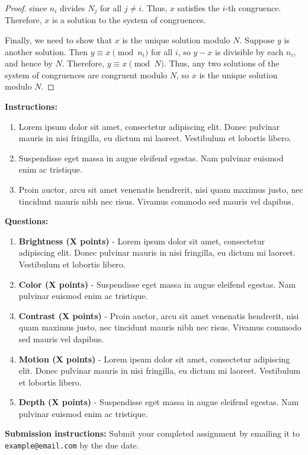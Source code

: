 \documentclass{article}
\begin{document}
\begin{itemize}
\begin{proof}
		since $n_i$ divides $N_j$ for all $j \neq i$. Thus, $x$ satisfies the $i$-th congruence. Therefore, $x$ is a solution to the system of congruences.
		
		Finally, we need to show that $x$ is the unique solution modulo $N$. Suppose $y$ is another solution. Then $y \equiv x \pmod{n_i}$ for all $i$, so $y-x$ is divisible by each $n_i$, and hence by $N$. Therefore, $y \equiv x \pmod{N}$. Thus, any two solutions of the system of congruences are congruent modulo $N$, so $x$ is the unique solution modulo $N$.
	\end{proof}
\end{itemize}

\noindent \textbf{Instructions:}
\begin{enumerate}[label=\alph*.]
    \item Lorem ipsum dolor sit amet, consectetur adipiscing elit. Donec pulvinar mauris in nisi fringilla, eu dictum mi laoreet. Vestibulum et lobortis libero.
    \item Suspendisse eget massa in augue eleifend egestas. Nam pulvinar euismod enim ac tristique.
    \item Proin auctor, arcu sit amet venenatis hendrerit, nisi quam maximus justo, nec tincidunt mauris nibh nec risus. Vivamus commodo sed mauris vel dapibus.
\end{enumerate}

\noindent \textbf{Questions:}

\begin{enumerate}[label=\textbf{\arabic*.}]
    \item \textbf{Brightness (X points)} - Lorem ipsum dolor sit amet, consectetur adipiscing elit. Donec pulvinar mauris in nisi fringilla, eu dictum mi laoreet. Vestibulum et lobortis libero.
    \item \textbf{Color (X points)} - Suspendisse eget massa in augue eleifend egestas. Nam pulvinar euismod enim ac tristique.
    \item \textbf{Contrast (X points)} - Proin auctor, arcu sit amet venenatis hendrerit, nisi quam maximus justo, nec tincidunt mauris nibh nec risus. Vivamus commodo sed mauris vel dapibus.
    \item \textbf{Motion (X points)} - Lorem ipsum dolor sit amet, consectetur adipiscing elit. Donec pulvinar mauris in nisi fringilla, eu dictum mi laoreet. Vestibulum et lobortis libero.
    \item \textbf{Depth (X points)} - Suspendisse eget massa in augue eleifend egestas. Nam pulvinar euismod enim ac tristique.
\end{enumerate}

\noindent \textbf{Submission instructions:} Submit your completed assignment by emailing it to \texttt{example@email.com} by the due date.
\end{document}
